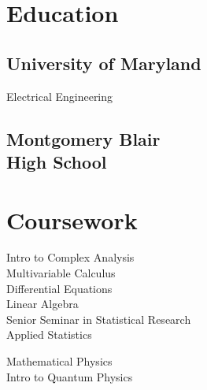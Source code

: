 \documentclass[]{deedy-resume-openfont}
\begin{document}

%
%

\begin{minipage}[t]{0.33\textwidth} 

\section{Education} 

\vspace{0.125cm}

\subsection{University of Maryland}
Electrical Engineering
\sectionsep

\subsection{Montgomery Blair \\ High School}

\sectionsep
\section{Coursework}

\vspace{0.125cm}

Intro to Complex Analysis \\
Multivariable Calculus \\
Differential Equations \\
Linear Algebra \\
Senior Seminar in Statistical Research \\
Applied Statistics \\

\vspace{0.125cm}

Mathematical Physics \\
Intro to Quantum Physics \\


\end{minipage}
\end{document}
